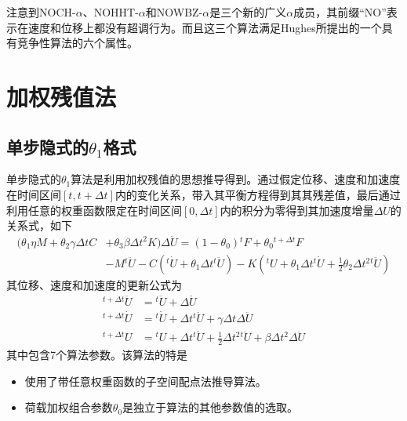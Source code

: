 注意到NOCH-$\alpha$、NOHHT-$\alpha$和NOWBZ-$\alpha$是三个新的广义$\alpha$成员，其前缀“NO”表示在速度和位移上都没有超调行为。而且这三个算法满足Hughes所提出的一个具有竞争性算法的六个属性\cite{book:dover,Hilber1978}。










\section{加权残值法}
\subsection{单步隐式的$\theta_1$格式}
单步隐式的$\theta_1$算法\cite{Hoff1988}是利用加权残值的思想推导得到。通过假定位移、速度和加速度在时间区间$[t,t+\Delta t]$内的变化关系，带入其平衡方程得到其其残差值，最后通过利用任意的权重函数限定在时间区间$[0,\Delta t]$内的积分为零得到其加速度增量$\Delta\ddot{U}$的关系式，如下
\begin{equation}
\begin{aligned}
(\theta_1\eta M+\theta_2\gamma\Delta tC&+\theta_3\beta\Delta t^2K)\Delta\ddot{U}=(1-\theta_0){^t\!F}+\theta_0{^{t+\Delta t}\!F}\\
&-M{^{t}\!\ddot{U}}-C({^t\!\dot{U}}+\theta_1\Delta t{^t\!\ddot{U}})-K({^t\!U}+\theta_1\Delta t{^t\!\dot{U}}+\frac{1}{2}\theta_2\Delta t^2{^t\!\ddot{U}})
\end{aligned}
\end{equation}
其位移、速度和加速度的更新公式为
\begin{align}
{^{t+\Delta t}\!\ddot{U}}&={^t\!\ddot{U}}+\Delta \ddot{U}\\
{^{t+\Delta t}\!\dot{U}}&={^t\!\dot{U}}+\Delta t{^t\!\ddot{U}}+\gamma\Delta t\Delta\ddot{U}\\
{^{t+\Delta t}\!U}&={^t\!U}+\Delta t{^t\!\dot{U}}+\frac12\Delta t^2{^t\!\ddot{U}}+\beta\Delta t^2\Delta\ddot{U}
\end{align}
其中包含7个算法参数。该算法的特是
\begin{itemize}
\item[\ddag] 使用了带任意权重函数的子空间配点法推导算法。
\item[\ddag] 荷载加权组合参数$\theta_0$是独立于算法的其他参数值的选取。
\end{itemize}

